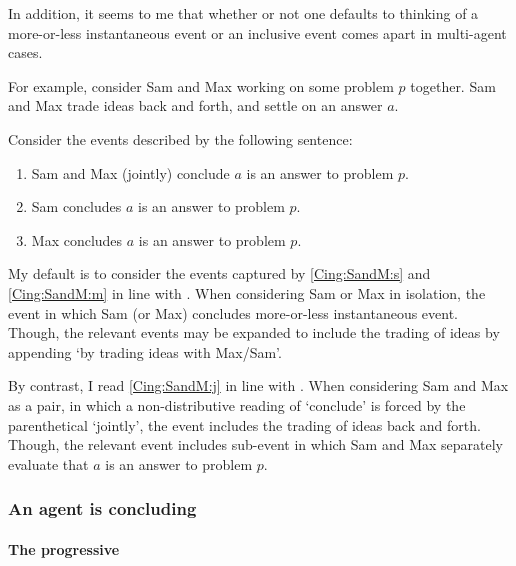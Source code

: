 \begin{note}
  In addition, it seems to me that whether or not one defaults to thinking of a more-or-less instantaneous event or an inclusive event comes apart in multi-agent cases.

  For example, consider Sam and Max working on some problem \(p\) together.
  Sam and Max trade ideas back and forth, and settle on an answer \(a\).

  Consider the events described by the following sentence:
  \begin{enumerate}[label=\arabic*., ref=(\arabic*)]
  \item
    \label{Cing:SandM:j}
    Sam and Max (jointly) conclude \(a\) is an answer to problem \(p\).
  \item
    \label{Cing:SandM:s}
    Sam concludes \(a\) is an answer to problem \(p\).
  \item
    \label{Cing:SandM:m}
    Max concludes \(a\) is an answer to problem \(p\).
  \end{enumerate}

  My default is to consider the events captured by \ref{Cing:SandM:s} and \ref{Cing:SandM:m} in line with \citeauthor{Gardner:1986wp}.
  When considering Sam or Max in isolation, the event in which Sam (or Max) concludes more-or-less instantaneous event.
  Though, the relevant events may be expanded to include the trading of ideas by appending `by trading ideas with Max/Sam'.

  By contrast, I read \ref{Cing:SandM:j} in line with \citeauthor{Bratman:1979aa}.
  When considering Sam and Max as a pair, in which a non-distributive reading of `conclude' is forced by the parenthetical `jointly', the event includes the trading of ideas back and forth.
  Though, the relevant event includes sub-event in which Sam and Max separately evaluate that \(a\) is an answer to problem \(p\).
\end{note}

\subsubsection{An agent is concluding}
\label{sec:event-which-an-1}

\paragraph{The progressive}

